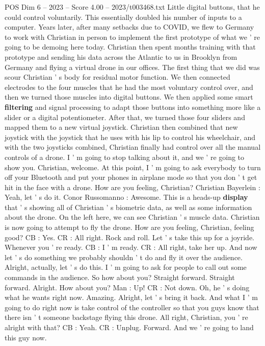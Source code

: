 \begin{textsample}{POS Dim 6 – 2023 – Score 4.00 – 2023/t003468.txt}
Little digital buttons, that he could control voluntarily.
This essentially doubled his number of inputs to a computer.
Years later, after many setbacks due to COVID, we flew to Germany to work with Christian in person to implement the first prototype of what we ' re going to be demoing here today.
Christian then spent months training with that prototype and sending his data across the Atlantic to us in Brooklyn from Germany and flying a virtual drone in our offices.
The first thing that we did was scour Christian ' s body for residual motor function.
We then connected electrodes to the four muscles that he had the most voluntary control over, and then we turned those muscles into digital buttons.
We then applied some smart \textbf{filtering} and signal processing to adapt those buttons into something more like a slider or a digital potentiometer.
After that, we turned those four sliders and mapped them to a new virtual joystick.
Christian then combined that new joystick with the joystick that he uses with his lip to control his wheelchair, and with the two joysticks combined, Christian finally had control over all the manual controls of a drone.
I ' m going to stop talking about it, and we ' re going to show you.
Christian, welcome.
At this point, I ' m going to ask everybody to turn off your Bluetooth and put your phones in airplane mode so that you don ' t get hit in the face with a drone.
How are you feeling, Christian?
Christian Bayerlein : Yeah, let ' s do it.
Conor Russomanno : Awesome.
This is a heads-up \textbf{display} that ' s showing all of Christian ' s biometric data, as well as some information about the drone.
On the left here, we can see Christian ' s muscle data.
Christian is now going to attempt to fly the drone.
How are you feeling, Christian, feeling good?
CB : Yes.
CR : All right.
Rock and roll.
Let ' s take this up for a joyride.
Whenever you ' re ready.
CB : I ' m ready.
CR : All right, take her up.
And now let ' s do something we probably shouldn ' t do and fly it over the audience.
Alright, actually, let ' s do this.
I ' m going to ask for people to call out some commands in the audience.
So how about you?
Straight forward.
Straight forward.
Alright.
How about you?
Man : Up!
CR : Not down.
Oh, he ' s doing what he wants right now.
Amazing.
Alright, let ' s bring it back.
And what I ' m going to do right now is take control of the controller so that you guys know that there isn ' t someone backstage flying this drone.
All right, Christian, you ' re alright with that?
CB : Yeah.
CR : Unplug.
Forward.
And we ' re going to land this guy now.

\end{textsample}
